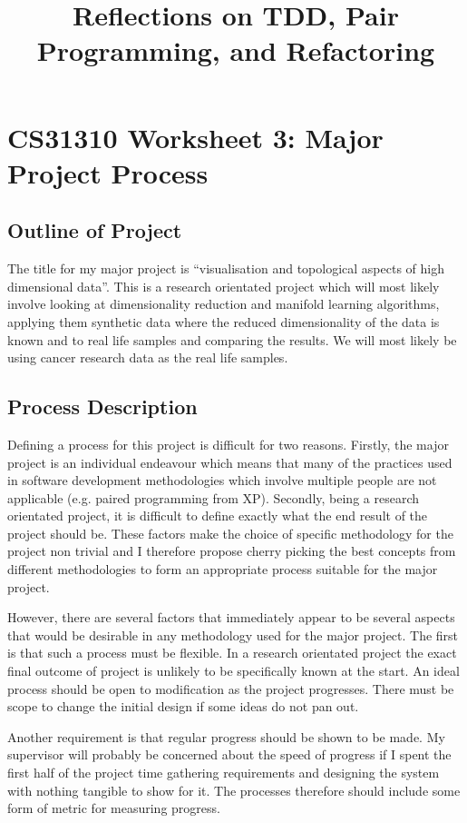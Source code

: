 \documentclass[paper=a4, fontsize=11pt]{scrartcl}	%
\title{
	\vspace{-0.5in}
	\usefont{OT1}{bch}{b}{n}
	 Reflections on TDD, Pair Programming, and Refactoring
}
\author{}
\date{}
\numberwithin{equation}{section} %
\numberwithin{figure}{section} %
\numberwithin{table}{section}
\begin{document}
\section*{CS31310 Worksheet 3: Major Project Process}

\subsection*{Outline of Project}
The title for my major project is ``visualisation and topological aspects of high dimensional data''. This is a research orientated project which will most likely involve looking at dimensionality reduction and manifold learning algorithms, applying them synthetic data where the reduced dimensionality of the data is known and to real life samples and comparing the results. We will most likely be using cancer research data as the real life samples.

\subsection*{Process Description}
Defining a process for this project is difficult for two reasons. Firstly, the major project is an individual endeavour which means that many of the practices used in software development methodologies which involve multiple people are not applicable (e.g. paired programming from XP). Secondly, being a research orientated project, it is difficult to define exactly what the end result of the project should be. These factors make the choice of specific methodology for the project non trivial and I therefore propose cherry picking the best concepts from different methodologies to form an appropriate process suitable for the major project.

However, there are several factors that immediately appear to be several aspects that would be desirable in any methodology used for the major project. The first is that such a process must be flexible. In a research orientated project the exact final outcome of project is unlikely to be specifically known at the start. An ideal process should be open to modification as the project progresses. There must be scope to change the initial design if some ideas do not pan out.

Another requirement is that regular progress should be shown to be made. My supervisor will probably be concerned about the speed of progress if I spent the first half of the project time gathering requirements and designing the system with nothing tangible to show for it. The processes therefore should include some form of metric for measuring progress.
\end{document}
